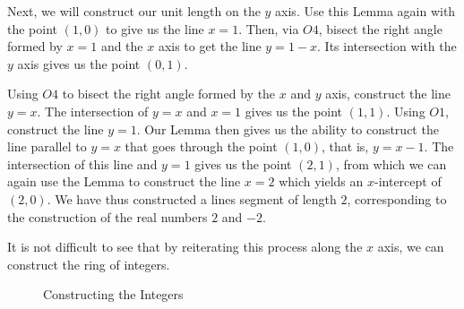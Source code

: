 \documentclass[]{article}
\begin{document}
  Next, we will construct our unit length on the $y$ axis. Use this Lemma again with the point $(1,0)$ to give us the line $x=1$. Then, via $O4$, bisect the right angle formed by $x=1$ and the $x$ axis to get the line $y=1-x$. Its intersection with the $y$ axis gives us the point $(0,1)$.
  
 Using $O4$ to bisect the right angle formed by the $x$ and $y$ axis, construct the line $y=x$. The intersection of $y=x$ and $x=1$ gives us the point $(1,1)$. Using $O1$, construct the line $y=1$. Our Lemma then gives us the ability to construct the line parallel to $y=x$ that goes through the point $(1,0)$, that is, $y=x-1$. The intersection of this line and $y=1$ gives us the point $(2,1)$, from which we can again use the Lemma to construct the line $x=2$ which yields an $x$-intercept of $(2,0)$. We have thus constructed a lines segment of length $2$, corresponding to the construction of the real numbers $2$ and $-2$.
  
  It is not difficult to see that by reiterating this process along the $x$ axis, we can construct the ring of integers. 
   
   \begin{figure}[t]
   	\centering
   	\caption{Constructing the Integers} \label{figure 3}
   \end{figure}
   
\end{document}
